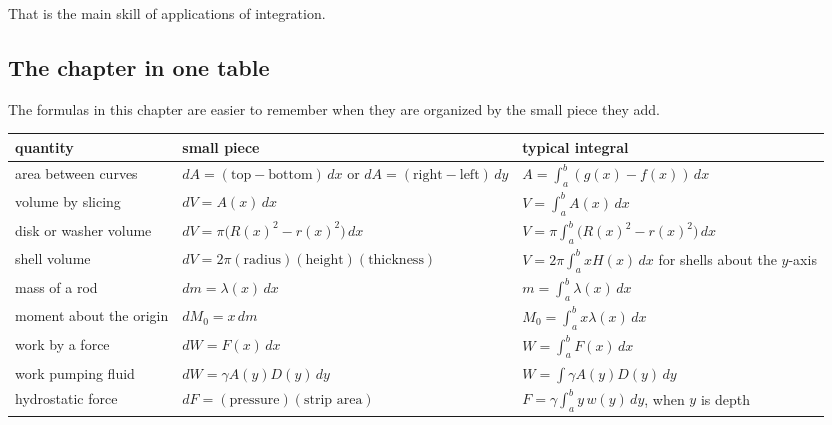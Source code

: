 That is the main skill of applications of integration.

\subsection{The chapter in one table}
\label{subsec:chapter10-small-piece-table}

The formulas in this chapter are easier to remember when they are organized by the
small piece they add.

\begin{center}
\renewcommand{\arraystretch}{1.45}
\begin{tabular}{p{}|p{}|p{}}
\textbf{quantity} & \textbf{small piece} & \textbf{typical integral} \\ \hline

area between curves &
\(\displaystyle dA=(\text{top}-\text{bottom})\,dx\) or
\(\displaystyle dA=(\text{right}-\text{left})\,dy\) &
\(\displaystyle A=\int_a^b (g(x)-f(x))\,dx\) \\

volume by slicing &
\(\displaystyle dV=A(x)\,dx\) &
\(\displaystyle V=\int_a^b A(x)\,dx\) \\

disk or washer volume &
\(\displaystyle dV=\pi\bigl(R(x)^2-r(x)^2\bigr)\,dx\) &
\(\displaystyle V=\pi\int_a^b \bigl(R(x)^2-r(x)^2\bigr)\,dx\) \\

shell volume &
\(\displaystyle dV=2\pi(\text{radius})(\text{height})(\text{thickness})\) &
\(\displaystyle V=2\pi\int_a^b xH(x)\,dx\) for shells about the \(y\)-axis \\

mass of a rod &
\(\displaystyle dm=\lambda(x)\,dx\) &
\(\displaystyle m=\int_a^b \lambda(x)\,dx\) \\

moment about the origin &
\(\displaystyle dM_0=x\,dm\) &
\(\displaystyle M_0=\int_a^b x\lambda(x)\,dx\) \\

work by a force &
\(\displaystyle dW=F(x)\,dx\) &
\(\displaystyle W=\int_a^b F(x)\,dx\) \\

work pumping fluid &
\(\displaystyle dW=\gamma A(y)D(y)\,dy\) &
\(\displaystyle W=\int \gamma A(y)D(y)\,dy\) \\

hydrostatic force &
\(\displaystyle dF=(\text{pressure})(\text{strip area})\) &
\(\displaystyle F=\gamma\int_a^b y\,w(y)\,dy\), when \(y\) is depth \\


\end{tabular}
\end{center}

